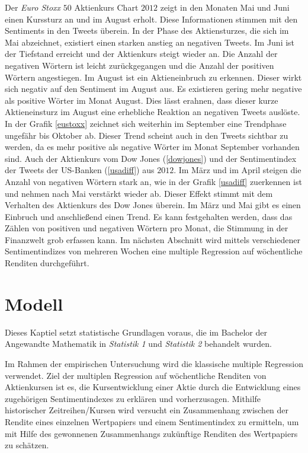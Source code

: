 Der \textit{Euro Stoxx} $50$ Aktienkurs Chart $2012$ zeigt in den Monaten Mai und Juni einen Kurssturz an und im August erholt. Diese Informationen stimmen mit den Sentiments in den Tweets überein. In der Phase des Aktiensturzes, die sich im Mai abzeichnet, existiert einen starken anstieg an negativen Tweets. Im Juni ist der Tiefstand erreicht und der Aktienkurs steigt wieder an. Die Anzahl der negativen Wörtern ist leicht zurückgegangen und die Anzahl der positiven Wörtern angestiegen. Im August ist ein Aktieneinbruch zu erkennen. Dieser wirkt sich negativ auf den Sentiment im August aus. Es existieren gering mehr negative als positive Wörter im Monat August. Dies lässt erahnen, dass dieser kurze Aktieneinsturz im August eine erhebliche Reaktion an negativen Tweets auslöste. In der Grafik \ref{eustoxx} zeichnet sich weiterhin im September eine Trendphase ungefähr bis Oktober ab. Dieser Trend scheint auch in den Tweets sichtbar zu werden, da es mehr positive als negative Wörter im Monat September vorhanden sind. Auch der Aktienkurs vom Dow Jones (\ref{dowjones}) und der Sentimentindex der Tweets der US-Banken (\ref{usadiff}) aus $2012$. Im März und im April steigen die Anzahl von negativen Wörtern stark an, wie in der Grafik \ref{usadiff} zuerkennen ist und nehmen nach Mai verstärkt wieder ab. Dieser Effekt stimmt mit dem Verhalten des Aktienkurs des Dow Jones überein. Im März und Mai gibt es einen Einbruch und anschließend einen Trend. Es kann festgehalten werden, dass das Zählen von positiven und negativen Wörtern pro Monat, die Stimmung in der Finanzwelt grob erfassen kann. Im nächsten Abschnitt wird mittels verschiedener Sentimentindizes von mehreren Wochen eine multiple Regression auf wöchentliche Renditen durchgeführt.

\section{Modell}\label{Model}
Dieses Kaptiel setzt statistische Grundlagen voraus, die im Bachelor der Angewandte Mathematik in \textit{Statistik 1} und \textit{Statistik 2} behandelt wurden. 
 
Im Rahmen der empirischen Untersuchung wird die klassische multiple Regression verwendet. Ziel der multiplen Regression auf wöchentliche Renditen von Aktienkursen ist es, die Kursentwicklung einer Aktie durch die Entwicklung eines zugehörigen Sentimentindexes zu erklären und vorherzusagen. Mithilfe historischer Zeitreihen/Kursen wird versucht ein Zusammenhang zwischen der Rendite eines einzelnen Wertpapiers und einem Sentimentindex zu ermitteln, um mit Hilfe des gewonnenen Zusammenhangs zukünftige Renditen des Wertpapiers zu schätzen. \\

